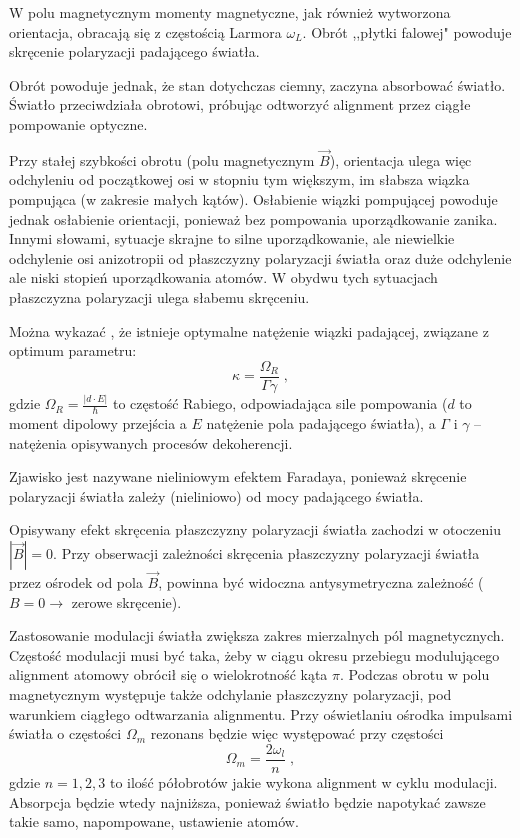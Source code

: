 \documentclass[a4paper,10pt]{article}
\begin{document}
W polu magnetycznym momenty magnetyczne, jak również wytworzona orientacja, obracają się z częstością Larmora $\omega_L$. Obrót ,,płytki falowej" powoduje skręcenie polaryzacji padającego światła.

Obrót powoduje jednak, że stan dotychczas ciemny, zaczyna absorbować światło. Światło przeciwdziała obrotowi, próbując odtworzyć alignment przez ciągłe pompowanie optyczne.

Przy stałej szybkości obrotu (polu magnetycznym $\vec B$), orientacja ulega więc odchyleniu od początkowej osi w stopniu tym większym, im słabsza wiązka pompująca (w zakresie małych kątów). Osłabienie wiązki pompującej powoduje jednak osłabienie orientacji, ponieważ bez pompowania uporządkowanie zanika. Innymi słowami, sytuacje skrajne to silne uporządkowanie, ale niewielkie odchylenie osi anizotropii od płaszczyzny polaryzacji światła oraz duże odchylenie ale niski stopień uporządkowania atomów. W obydwu tych sytuacjach płaszczyzna polaryzacji ulega słabemu skręceniu.

Można wykazać \cite{srivansan}, że istnieje optymalne natężenie wiązki padającej, związane z optimum parametru:
\begin{equation}
\kappa=\frac{\Omega_R}{\Gamma\gamma} \; ,
\end{equation}
gdzie $\Omega_R=\frac{|d \cdot E|}{\hbar}$ to częstość Rabiego, odpowiadająca sile pompowania ($d$ to moment dipolowy przejścia a $E$ natężenie pola padającego światła), a $\Gamma$ i $\gamma$ -- natężenia opisywanych procesów dekoherencji.

Zjawisko jest nazywane nieliniowym efektem Faradaya, ponieważ skręcenie polaryzacji światła zależy (nieliniowo) od mocy padającego światła.

Opisywany efekt skręcenia płaszczyzny polaryzacji światła zachodzi w otoczeniu $|\vec B|=0$. Przy obserwacji zależności skręcenia płaszczyzny polaryzacji światła przez ośrodek od pola $\vec B$, powinna być widoczna antysymetryczna zależność ($B=0\rightarrow$ zerowe skręcenie).

 Zastosowanie modulacji światła zwiększa zakres mierzalnych pól magnetycznych. Częstość modulacji musi być taka, żeby w ciągu okresu przebiegu modulującego alignment atomowy obrócił się o wielokrotność kąta $\pi$. 
Podczas obrotu w polu magnetycznym występuje także odchylanie płaszczyzny polaryzacji, pod warunkiem ciągłego odtwarzania alignmentu. Przy oświetlaniu ośrodka impulsami światła o częstości $\Omega_m$ rezonans będzie więc występować przy częstości
\begin{equation}
\Omega_m=\frac{2 \omega_l}{n} \; ,
\end{equation}
gdzie $n=1,2,3$ to ilość półobrotów jakie wykona alignment w cyklu modulacji. Absorpcja będzie wtedy najniższa, ponieważ światło będzie napotykać zawsze takie samo, napompowane, ustawienie atomów.
\end{document}
